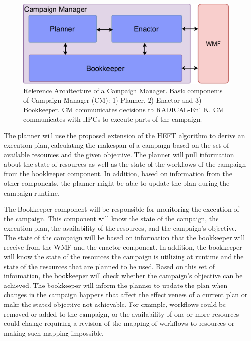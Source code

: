 \begin{figure}[t]
    \centering
    \includegraphics[width=.95\textwidth]{figures/CEM_design.pdf}
    \caption{Reference Architecture of a Campaign Manager. Basic 
    components of Campaign Manager (CM): 1) Planner, 2) Enactor and 3) Bookkeeper. 
    CM communicates decisions to RADICAL-EnTK. CM communicates with HPCs to 
    execute parts of the campaign.}\label{fig:refarch}
\end{figure}

The planner will use the proposed extension of the HEFT algorithm to derive an execution plan, calculating the makespan of a campaign based on the set of available resources and the given objective. 
The planner will pull information about the state of resources as well as the state of the workflows of the campaign from the bookkeeper component.
In addition, based on information from the other components, the planner might be able to update the plan during the campaign runtime. 


The Bookkeeper component will be responsible for monitoring the execution of the campaign.
This component will know the state of the campaign, the execution plan, the availability of the resources, and the campaign's objective.
The state of the campaign will be based on information that the bookkeeper will receive from the WMF and the enactor component.
In addition, the bookkeeper will know the state of the resources the campaign is utilizing at runtime and the state of the resources that are planned to be used.
Based on this set of information, the bookkeeper will check whether the campaign's objective can be achieved.
The bookkeeper will inform the planner to update the plan when changes in the campaign happens that affect the effectiveness of a current plan or make the stated objective not achievable. 
For example, workflows could be removed or added to the campaign, or the availability of one or more resources could change requiring a revision of the mapping of workflows to resources or making such mapping impossible.

